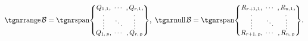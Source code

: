 $\range\mB=\Spn{\small\begin{Bmatrix} \underset{\;,}{Q_{1,1}}, &\hspace{-6pt} \cdots &\hspace{-6pt} ,\underset{\!\!,}{Q_{r,1}},\\[-2pt] \vdots &\hspace{-6pt} \ddots &\hspace{-6pt} \vdots\\[-2pt] \overset{\;,}{Q_{1,\,p}}, &\hspace{-6pt} \cdots &\hspace{-6pt} ,\overset{\!\!\!,}{Q_{r,\,p}}\end{Bmatrix}},\;\null\mB=\Spn{\small\begin{Bmatrix} \underset{\;,}{R_{r+1,1}}, &\hspace{-6pt} \cdots &\hspace{-6pt} ,\underset{\!\!,}{R_{n,1}},\\[-2pt] \vdots &\hspace{-6pt} \ddots &\hspace{-6pt} \vdots\\[-2pt] \overset{\;,}{R_{r+1,\,p}}, &\hspace{-6pt} \cdots &\hspace{-6pt} ,\overset{\!\!\!,}{R_{n,\,p}}\end{Bmatrix}}.$\PfEnd[-14pt]
\SepLine\pagebreak


